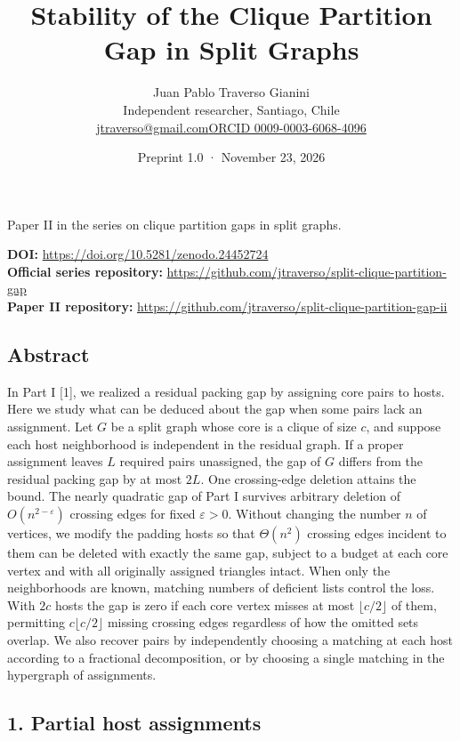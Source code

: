 \documentclass[english,11pt,a4paper]{article}
\title{Stability of the Clique Partition Gap in Split Graphs}
\author{Juan Pablo Traverso Gianini\\\small Independent researcher, Santiago, Chile\\\small\href{mailto:jtraverso@gmail.com}{jtraverso@gmail.com}\quad\href{https://orcid.org/0009-0003-6068-4096}{ORCID 0009-0003-6068-4096}}
\date{Preprint 1.0 \enspace · \enspace November 23, 2026}
\begin{document}
\raggedbottom\maketitle
\begin{center}\small Paper II in the series on clique partition gaps in split graphs.\end{center}
\noindent\textbf{DOI:} \url{https://doi.org/10.5281/zenodo.24452724}\\
\textbf{Official series repository:} \url{https://github.com/jtraverso/split-clique-partition-gap}\\
\textbf{Paper II repository:} \url{https://github.com/jtraverso/split-clique-partition-gap-ii}
\subsection{Abstract}\label{abstract}

In Part I {[}1{]}, we realized a residual packing gap by assigning core pairs to hosts. Here we study what can be deduced about the gap when some pairs lack an assignment. Let \(G\) be a split graph whose core is a clique of size \(c\), and suppose each host neighborhood is independent in the residual graph. If a proper assignment leaves \(L\) required pairs unassigned, the gap of \(G\) differs from the residual packing gap by at most \(2L\). One crossing-edge deletion attains the bound. The nearly quadratic gap of Part I survives arbitrary deletion of \(O(n^{2-\varepsilon})\) crossing edges for fixed \(\varepsilon>0\). Without changing the number \(n\) of vertices, we modify the padding hosts so that \(\Theta(n^2)\) crossing edges incident to them can be deleted with exactly the same gap, subject to a budget at each core vertex and with all originally assigned triangles intact. When only the neighborhoods are known, matching numbers of deficient lists control the loss. With \(2c\) hosts the gap is zero if each core vertex misses at most \(\lfloor c/2\rfloor\) of them, permitting \(c\lfloor c/2\rfloor\) missing crossing edges regardless of how the omitted sets overlap. We also recover pairs by independently choosing a matching at each host according to a fractional decomposition, or by choosing a single matching in the hypergraph of assignments.

\subsection{1. Partial host assignments}\label{partial-host-assignments}
\end{document}
